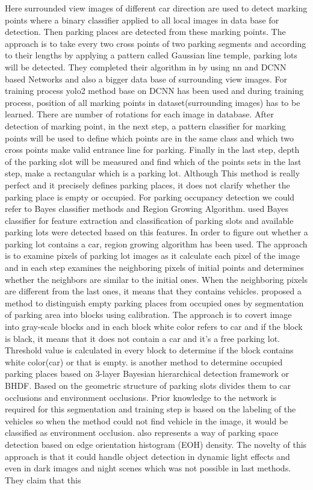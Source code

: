 Here surrounded view images of different car direction are used to detect marking points where a binary classifier applied to all local images in data base for detection. Then parking places are detected from these marking points. The approach is to take every two cross points of two parking segments and according to their lengths by applying a pattern called Gaussian line temple, parking lots will be detected. They completed their algorithm in \cite{markingPointJournal} by using \acrshort{nn} and DCNN based Networks and also a bigger data base of surrounding view images. For training process \acrshort{yolo}2 method base on DCNN has been used and during training process, position of all marking points in dataset(surrounding images) has to be learned. There are number of rotations for each image in database. After detection of marking point, in the next step, a pattern classifier for marking points will be used to define which points are in the same class and which two cross points make valid entrance line for parking. Finally in the last step, depth of the parking slot will be measured and find which of the points sets in the last step, make a rectangular which is a parking lot. Although This method is really perfect and it precisely defines parking places, it does not clarify whether the parking place is empty or occupied. For parking occupancy detection we could refer to Bayes classifier methods and Region Growing Algorithm. \cite{visual-parking-slot} used Bayes classifier for feature extraction and classification of parking slots and available parking lots were detected based on this features. In order to figure out whether a parking lot contains a car, region growing algorithm has been used. The approach is to examine pixels of parking lot images as it calculate each pixel of the image and in each step examines the neighboring pixels of initial points and determines whether the neighbors are similar to the initial ones. When the neighboring pixels are different from the last ones, it means that they contains vehicles. \cite{empty-parking-vision} proposed a method to distinguish empty parking places from occupied ones by segmentation of parking area into blocks using calibration. The approach is to covert image into gray-scale blocks and in each block white color refers to car and if the block is black, it means that it does not contain a car and it's a free parking lot. Threshold value is calculated in every block to determine if the block contains white color(car) or that is empty. \cite{US-visionbased} is another method to determine occupied parking places based on 3-layer Bayesian hierarchical detection framework or BHDF. Based on the geometric structure of parking slots divides them to car occlusions and environment occlusions. Prior knowledge to the network is required for this segmentation and training step is based on the labeling of the vehicles so when the method could not find vehicle in the image, it would be classified as environment occlusion. \cite{histogramEOH} also represents a way of parking space detection based on edge orientation histogram (EOH) density. The novelty of this approach is that it could handle object detection in dynamic light effects and even in dark images and night scenes which was not possible in last methods. They claim that this 